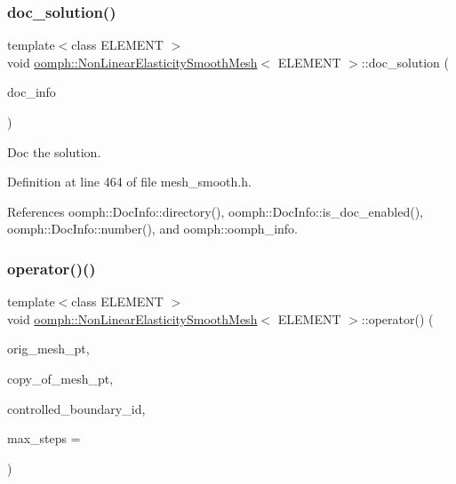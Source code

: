 \subsubsection{\texorpdfstring{doc\+\_\+solution()}{doc\_solution()}}
{\footnotesize\ttfamily template$<$class E\+L\+E\+M\+E\+NT $>$ \\
void \hyperlink{classoomph_1_1NonLinearElasticitySmoothMesh}{oomph\+::\+Non\+Linear\+Elasticity\+Smooth\+Mesh}$<$ E\+L\+E\+M\+E\+NT $>$\+::doc\+\_\+solution (\begin{DoxyParamCaption}\item[{\hyperlink{classoomph_1_1DocInfo}{Doc\+Info} \&}]{doc\+\_\+info }\end{DoxyParamCaption})\hspace{0.3cm}{\ttfamily [inline]}}



Doc the solution. 



Definition at line 464 of file mesh\+\_\+smooth.\+h.



References oomph\+::\+Doc\+Info\+::directory(), oomph\+::\+Doc\+Info\+::is\+\_\+doc\+\_\+enabled(), oomph\+::\+Doc\+Info\+::number(), and oomph\+::oomph\+\_\+info.

\mbox{\label{classoomph_1_1NonLinearElasticitySmoothMesh_a08291c80b1b4e30fdce23be10c54d3bb}} 
\subsubsection{\texorpdfstring{operator()()}{operator()()}\hspace{0.1cm}{\footnotesize\ttfamily [1/2]}}
{\footnotesize\ttfamily template$<$class E\+L\+E\+M\+E\+NT $>$ \\
void \hyperlink{classoomph_1_1NonLinearElasticitySmoothMesh}{oomph\+::\+Non\+Linear\+Elasticity\+Smooth\+Mesh}$<$ E\+L\+E\+M\+E\+NT $>$\+::operator() (\begin{DoxyParamCaption}\item[{\hyperlink{classoomph_1_1SolidMesh}{Solid\+Mesh} $\ast$}]{orig\+\_\+mesh\+\_\+pt,  }\item[{\hyperlink{classoomph_1_1SolidMesh}{Solid\+Mesh} $\ast$}]{copy\+\_\+of\+\_\+mesh\+\_\+pt,  }\item[{const \hyperlink{classoomph_1_1Vector}{Vector}$<$ unsigned $>$ \&}]{controlled\+\_\+boundary\+\_\+id,  }\item[{const unsigned \&}]{max\+\_\+steps = {} }\end{DoxyParamCaption})\hspace{0.3cm}{\ttfamily [inline]}}



